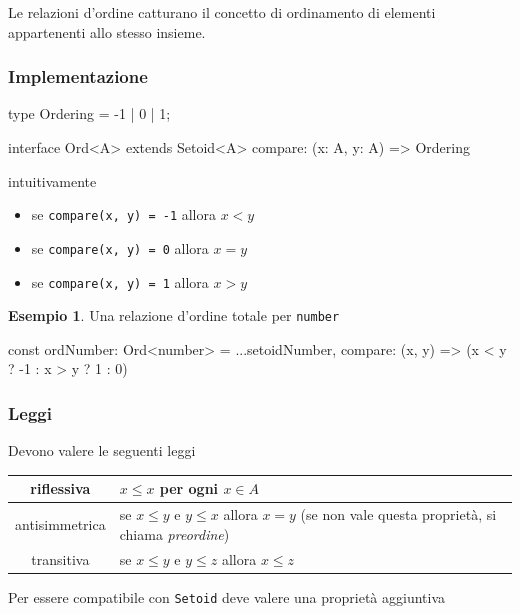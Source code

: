 \documentclass[12pt]{article}
\theoremstyle{definition}
\newtheorem{example}{Esempio}[section]
\newenvironment{code}
  {\vspace{0.5cm} \VerbatimEnvironment\begin{typescriptcode}}
  {\end{typescriptcode} \vspace{0.2cm}}
\begin{document}
Le relazioni d'ordine catturano il concetto di ordinamento di elementi appartenenti allo stesso insieme.

\subsubsection{Implementazione}

\begin{code}
type Ordering = -1 | 0 | 1;

interface Ord<A> extends Setoid<A> {
  compare: (x: A, y: A) => Ordering
}
\end{code}

intuitivamente

\begin{itemize}
\item se \texttt{compare(x, y) = -1} allora $x < y$
\item se \texttt{compare(x, y) = 0} allora $x = y$
\item se \texttt{compare(x, y) = 1} allora $x > y$
\end{itemize}

\begin{example}
Una relazione d'ordine totale per \texttt{number}

\begin{code}
const ordNumber: Ord<number> = {
  ...setoidNumber,
  compare: (x, y) => (x < y ? -1 : x > y ? 1 : 0)
}
\end{code}
\end{example}

\subsubsection{Leggi}

Devono valere le seguenti leggi

\begin{center}
\bgroup
\def\arraystretch{1.5}
\begin{tabular}{ |c|p{10cm}| }
\hline
riflessiva & $x \leq x$ per ogni $x \in A$ \\
\hline
antisimmetrica & se $x \leq y$ e $y \leq x$ allora $x = y$ (se non vale questa proprietà, si chiama \emph{preordine}) \\
\hline
transitiva & se $x \leq y$ e $y \leq z$ allora $x \leq z$ \\
\hline
\end{tabular}
\egroup
\end{center}

Per essere compatibile con \texttt{Setoid} deve valere una proprietà aggiuntiva
\end{document}
